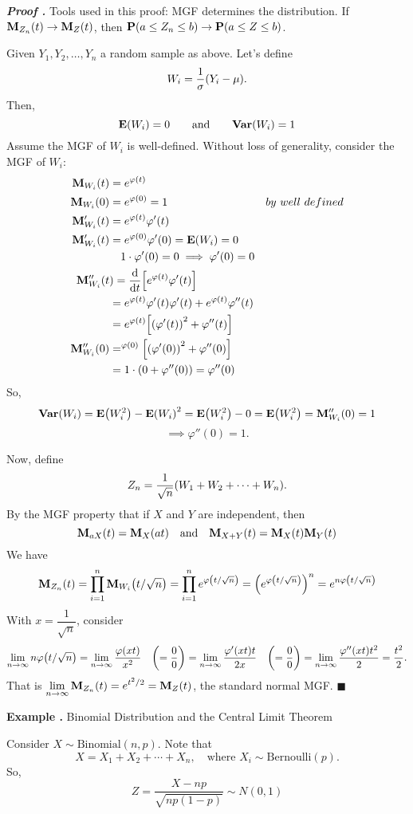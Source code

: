 \documentclass[12pt, a4paper]{article}
\newcounter{index}[subsection]
\newenvironment*{eg}{\begin{framed}\par\noindent\textbf{Example \thesubsection.\stepcounter{index}\theindex}}{\par\end{framed}}
\newcounter{nprf}[subsection]
\newenvironment*{prf}{\par\indent\textbf{\textit{Proof \stepcounter{nprf}\thenprf.}}}{\hfill$\blacksquare$\par}
\def\phi{\varphi}
\def\dsst{\displaystyle}
\def\E{\vb{E}}
\def\Var{\vb{Var}}
\def\P{\vb{P}}
\def\M{\vb{M}}
\begin{document}
\begin{prf}
	Tools used in this proof: MGF determines the distribution. If $\M_{Z_n}(t)\to\M_Z(t)$, then $\P(a\leq Z_n\leq b)\to\P(a\leq Z\leq b)$. \par 
	Given $Y_1,Y_2,\dots,Y_n$ a random sample as above. Let's define \[W_i=\dfrac{1}{\sigma}\qty(Y_i-\mu).\] Then, \[\E\qty(W_i)=0\qquad\text{and}\qquad\Var\qty(W_i)=1\] Assume the MGF of $W_i$ is well-defined. Without loss of generality, consider the MGF of $W_i$: \begin{align*}\M_{W_i}(t)&=e^{\phi(t)}\\\M_{W_i}(0)&=e^{\phi(0)}=1&by\ well\ defined\\\M_{W_i}'(t)&=e^{\phi(t)}\phi'(t)\\\M'_{W_i}(t)&=e^{\phi(0)}\phi'(0)=\E\qty(W_i)=0\\&\quad 1\cdot\phi'(0)=0\implies\phi'(0)=0\\\M_{W_i}''(t&)=\dv{t}\qty[e^{\phi(t)}\phi'(t)]\\&=e^{\phi(t)}\phi'(t)\phi'(t)+e^{\phi(t)}\phi''(t)\\&=e^{\phi(t)}\qty[\qty(\phi'(t))^2+\phi''(t)]\\\M_{W_i}''(0)&=^{\phi(0)}\qty[\qty(\phi'(0))^2+\phi''(0)]\\&=1\cdot\qty(0+\phi''(0))=\phi''(0)\end{align*} So, \[\Var\qty(W_i)=\E\qty(W_i^2)-\E\qty(W_i)^2=\E\qty(W_i^2)-0=\E\qty(W_i^2)=\M_{W_i}''(0)=1\] \[\implies\phi''(0)=1.\]\par 
	Now, define \[Z_n=\dfrac{1}{\sqrt{n}}\qty(W_1+W_2+\cdots+W_n).\] By the MGF property that if $X$ and $Y$ are independent, then \[\M_{aX}(t)=\M_X(at)\quad\text{and}\quad\M_{X+Y}(t)=\M_X(t)\M_Y(t)\] We have \[\M_{Z_n}(t)=\prod_{i=1}^n\M_{W_i}\qty(t/\sqrt{n})=\prod_{i=1}^ne^{\phi\qty(t/\sqrt{n})}=\qty(e^{\phi\qty(t/\sqrt{n})})^n=e^{n\phi\qty(t/\sqrt{n})}\] With $x=\dfrac{1}{\sqrt{n}}$, consider \begin{align*}\lim_{n\to\infty}n\phi\qty(t/\sqrt{n})=\lim_{n\to\infty}\dfrac{\phi(xt)}{x^2}\quad\qty(=\dfrac{0}{0})=\lim_{n\to\infty}\dfrac{\phi'(xt)t}{2x}\quad\qty(=\dfrac{0}{0})=\lim_{n\to\infty}\dfrac{\phi''(xt)t^2}{2}=\dfrac{t^2}{2}.\end{align*} That is $\dsst\lim_{n\to\infty}\M_{Z_n}(t)=e^{t^2/2}=\M_Z(t)$, the standard normal MGF. 
\end{prf}
\begin{eg} 
	Binomial Distribution and the Central Limit Theorem\par 
	Consider $X\sim\text{Binomial}(n,p)$. Note that \[X=X_1+X_2+\cdots+X_n,\quad\text{where }X_i\sim\text{Bernoulli}(p).\] So, \[Z=\dfrac{X-np}{\sqrt{np(1-p)}}\sim N(0,1)\]
\end{eg}
\end{document}
